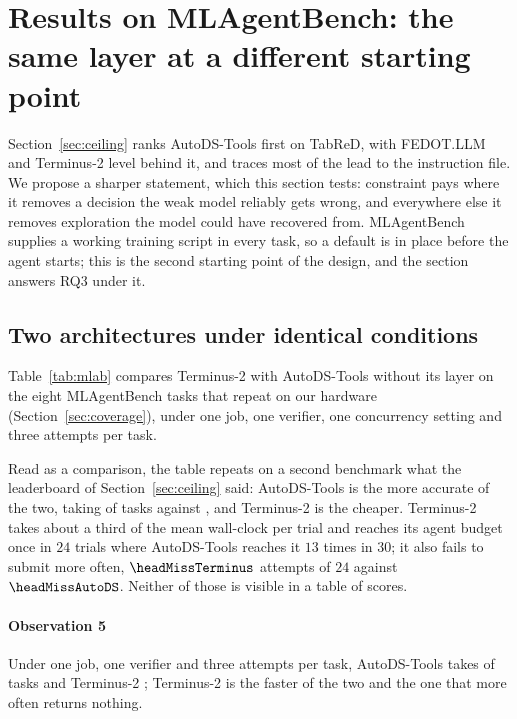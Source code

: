 \section{Results on MLAgentBench: the same layer at a different starting point}
\label{sec:mlab}


Section~\ref{sec:ceiling} ranks AutoDS-Tools first on TabReD, with FEDOT.LLM
and Terminus-2 level behind it, and traces most of the lead to the
instruction file. We propose a sharper statement, which this section tests: constraint pays where
it removes a decision the weak model reliably gets wrong, and everywhere else
it removes exploration the model could have recovered from. MLAgentBench
supplies a working training script in every task, so a default is in place
before the agent starts; this is the second starting point of the design, and
the section answers RQ3 under it.

\subsection{Two architectures under identical conditions}
\label{sec:headtohead}

Table~\ref{tab:mlab} compares Terminus-2 with AutoDS-Tools without its layer
on the eight MLAgentBench tasks that repeat on our hardware
(Section~\ref{sec:coverage}), under one job, one verifier, one concurrency
setting and three attempts per task. 


Read as a comparison, the table repeats on a second benchmark what the
leaderboard of Section~\ref{sec:ceiling} said: AutoDS-Tools is the more
accurate of the two, taking \headWinsAutoDS{} of \headTasks{} tasks against
\headWinsTerminus{}, and Terminus-2 is the cheaper. Terminus-2 takes about a
third of the mean wall-clock per trial and reaches its agent budget once in
$24$ trials where AutoDS-Tools reaches it $13$ times in $30$; it also fails to
submit more often, $\headMissTerminus$ attempts of $24$ against
$\headMissAutoDS$. Neither of those is visible in a table of scores.

\paragraph{Observation 5} Under one job, one verifier and three attempts per
task, AutoDS-Tools takes \headWinsAutoDS{} of \headTasks{} tasks and Terminus-2
\headWinsTerminus{}; Terminus-2 is the faster of the two and the one that more
often returns nothing.

